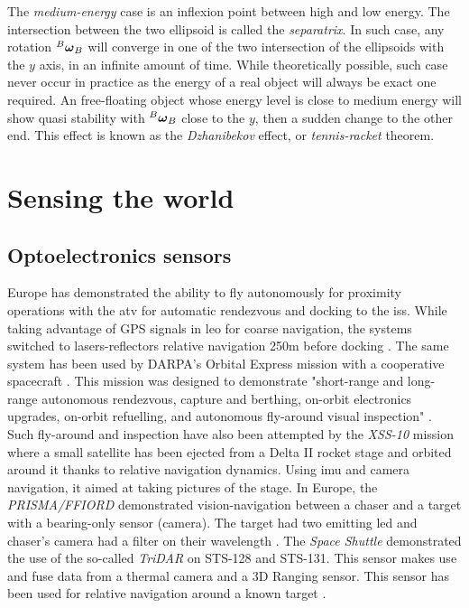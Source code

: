 The \emph{medium-energy} case is an inflexion point between high and low energy. The intersection between the two ellipsoid is called the \emph{separatrix}. In such case, any rotation $^{B}\boldsymbol{\mathbf{\omega}}_{B}$ will converge in one of the two intersection of the ellipsoids with the $y$ axis, in an infinite amount of time. While theoretically possible, such case never occur in practice as the energy of a real object will always be exact one required. An free-floating object whose energy level is close to medium energy will show quasi stability with $^{B}\boldsymbol{\mathbf{\omega}}_{B}$ close to the $y$, then a sudden change to the other end. This effect is known as the \emph{Dzhanibekov} effect, or \emph{tennis-racket} theorem.


\section{Sensing the world}\label{C2:sensing}
\subsection{Optoelectronics sensors}

Europe has demonstrated the ability to fly autonomously for proximity operations with the \gls{atv} for automatic rendezvous and docking to the \gls{iss}. While taking advantage of GPS signals in \gls{leo} for coarse navigation, the systems switched to lasers-reflectors relative navigation 250m before docking \citep{fehse_automated_2003}. The same system has been used by DARPA's Orbital Express mission with a cooperative spacecraft \citep{howard_orbital_2008}. This mission was designed to demonstrate "short-range and long-range autonomous rendezvous, capture and berthing, on-orbit electronics upgrades, on-orbit refuelling, and autonomous fly-around visual inspection" \citep{friend_orbital_2008}. Such fly-around and inspection have also been attempted by the \emph{XSS-10} mission \citep{davis_xss-10_2004} where a small satellite has been ejected from a Delta II rocket stage and orbited around it thanks to relative navigation dynamics. Using \gls{imu} and camera navigation, it aimed at taking pictures of the stage. In Europe, the \emph{PRISMA/FFIORD} demonstrated vision-navigation between a chaser and a target with a bearing-only sensor (camera). The target had two emitting \gls{led} and chaser's camera had a filter on their wavelength \citep{delpech_results_2013}. The \emph{Space Shuttle} demonstrated the use of the so-called \emph{TriDAR} on STS-128 and STS-131. This sensor makes use and fuse data from a thermal camera and a 3D Ranging sensor. This sensor has been used for relative navigation around a known target \citep{ruel_space_2012}.

